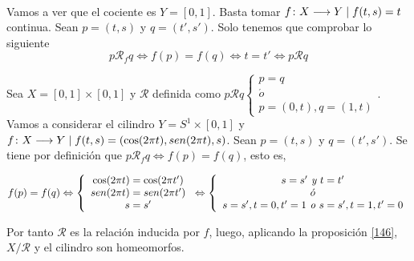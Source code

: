 \documentclass[GTS.tex]{subfiles}
\begin{document}
\begin{ej}\


Vamos a ver que el cociente es $Y=[0,1]$. Basta tomar $f\colon{X}\longrightarrow{Y}\mid f(t,s)=t$ continua. Sean $p=(t,s)$ y $q=(t',s')$. Solo tenemos que comprobar lo siguiente
\[
p\mathcal{R}_f q\Leftrightarrow f(p)=f(q)\Leftrightarrow t=t'\Leftrightarrow p\mathcal{R}q
\]
\end{ej}

\vspace{0.2cm}

\begin{ej}[Cilindro] Sea $X=[0,1]\times [0,1]$ y $\mathcal{R}$ definida como $p\mathcal{R}q\begin{cases}
p=q\\
\acute{o}\\
p=(0,t),q=(1,t)
\end{cases}$. Vamos a considerar el cilindro $Y=S^1\times[0,1]$ y $f\colon{X}\longrightarrow{Y}\mid f(t,s)=(\cos(2\pi t), sen (2\pi t), s)$. Sean $p=(t,s)$ y $q=(t',s')$. Se tiene por definición que $p\mathcal{R}_f q\Leftrightarrow f(p)=f(q)$, esto es,

\[
f(p)=f(q)\Leftrightarrow\left\{
\begin{array}{c}
\cos(2\pi t)=\cos(2\pi t')\\
sen (2\pi t)= sen (2\pi t')\\
s=s'
\end{array}\right. \Leftrightarrow\left\{\begin{array}{c}
s=s'\textit{ y } t=t'\\
\acute{o}\\
s=s',t=0,t'=1\textit{ o }s=s',t=1,t'=0
\end{array}\right.
\]

Por tanto $\mathcal{R}$ es la relación inducida por $f$, luego, aplicando la proposición \ref{146}, $X/\mathcal{R}$ y el cilindro son homeomorfos.
\end{ej}
\end{document}
